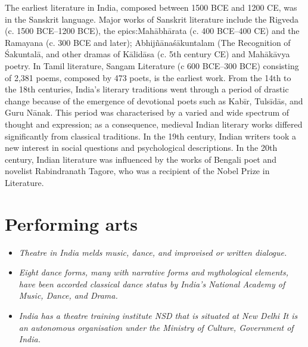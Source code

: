 The earliest literature in India, composed between 1500 BCE and 1200 CE,
was in the Sanskrit language. Major works of Sanskrit literature include
the Rigveda (c. 1500 BCE--1200 BCE), the epics:Mahābhārata (c. 400
BCE--400 CE) and the Ramayana (c. 300 BCE and later);
Abhijñānaśākuntalam (The Recognition of Śakuntalā, and other dramas of
Kālidāsa (c. 5th century CE) and Mahākāvya poetry. In Tamil literature,
Sangam Literature (c 600 BCE--300 BCE) consisting of 2,381 poems,
composed by 473 poets, is the earliest work. From the 14th to the 18th
centuries, India's literary traditions went through a period of drastic
change because of the emergence of devotional poets such as Kabīr,
Tulsīdās, and Guru Nānak. This period was characterised by a varied and
wide spectrum of thought and expression; as a consequence, medieval
Indian literary works differed significantly from classical traditions.
In the 19th century, Indian writers took a new interest in social
questions and psychological descriptions. In the 20th century, Indian
literature was influenced by the works of Bengali poet and novelist
Rabindranath Tagore, who was a recipient of the Nobel Prize in
Literature.

\section{Performing arts}\label{performing-arts}

\begin{itemize}
\item
  \emph{Theatre in India melds music, dance, and improvised or written
  dialogue.}
\item
  \emph{Eight dance forms, many with narrative forms and mythological
  elements, have been accorded classical dance status by India's
  National Academy of Music, Dance, and Drama.}
\item
  \emph{India has a theatre training institute NSD that is situated at
  New Delhi It is an autonomous organisation under the Ministry of
  Culture, Government of India.}
\end{itemize}

